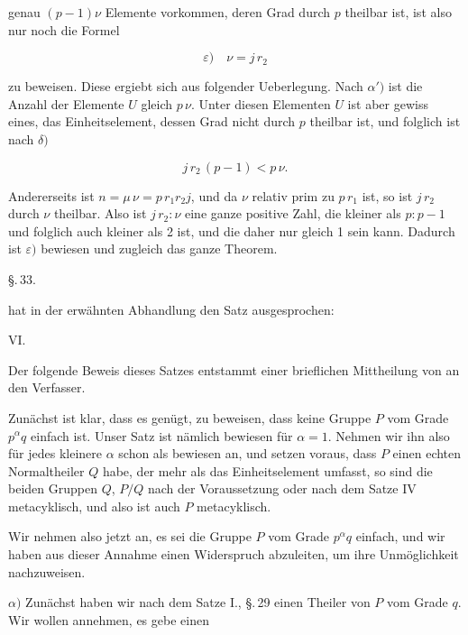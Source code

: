 genau $(p-1)\nu$ Elemente vorkommen, deren Grad durch $p$ theilbar ist, ist also nur noch die Formel

\[ \varepsilon)\quad \nu = j\,r_2 \]

zu beweisen. Diese ergiebt sich aus folgender Ueberlegung. Nach $\alpha')$ ist die Anzahl der Elemente $U$ gleich $p\,\nu$. Unter diesen Elementen $U$ ist aber gewiss eines, das Einheitselement, dessen Grad nicht durch $p$ theilbar ist, und folglich ist nach $\delta)$

\[ j\,r_2\,(p-1) < p\,\nu. \]

Andererseits ist $n = \mu\,\nu = p\,r_1 r_2 j$, und da $\nu$ relativ prim zu $p\,r_1$ ist, so ist $j\,r_2$ durch $\nu$ theilbar. Also ist $j\,r_2 : \nu$ eine ganze positive Zahl, die kleiner als $p : p-1$ und folglich auch kleiner als 2 ist, und die daher nur gleich 1 sein kann. Dadurch ist $\varepsilon)$ bewiesen und zugleich das ganze Theorem.

\begin{center}
\S.\,33.

\end{center}

 hat in der erwähnten Abhandlung den Satz ausgesprochen:

VI. 

Der folgende Beweis dieses Satzes entstammt einer brieflichen Mittheilung von  an den Verfasser.

Zunächst ist klar, dass es genügt, zu beweisen, dass keine Gruppe $P$ vom Grade $p^{\alpha} q$ einfach ist. Unser Satz ist nämlich bewiesen für $\alpha = 1$. Nehmen wir ihn also für jedes kleinere $\alpha$ schon als bewiesen an, und setzen voraus, dass $P$ einen echten Normaltheiler $Q$ habe, der mehr als das Einheitselement umfasst, so sind die beiden Gruppen $Q$, $P/Q$ nach der Voraussetzung oder nach dem Satze IV metacyklisch, und also ist auch $P$ metacyklisch.

Wir nehmen also jetzt an, es sei die Gruppe $P$ vom Grade $p^{\alpha} q$ einfach, und wir haben aus dieser Annahme einen Widerspruch abzuleiten, um ihre Unmöglichkeit nachzuweisen.

$\alpha)$ Zunächst haben wir nach dem Satze I., \S.\,29 einen Theiler von $P$ vom Grade $q$. Wir wollen annehmen, es gebe einen
